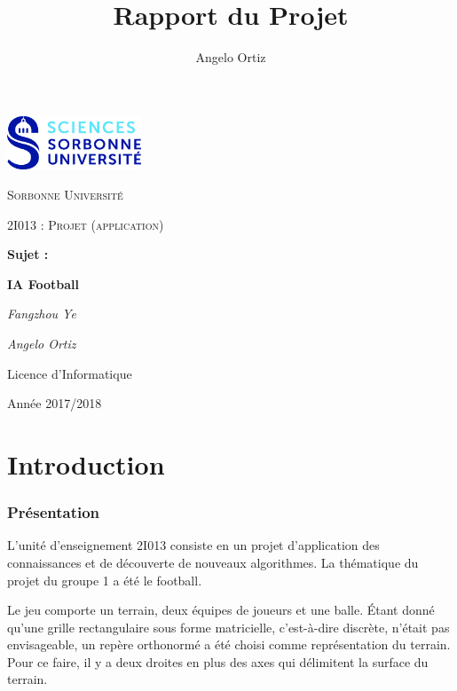 \documentclass[12pt,a4paper]{article}
\author{Angelo Ortiz}
\title{Rapport du Projet}
\begin{document}
\begin{titlepage}
  \centering
  \includegraphics[width=0.30\textwidth]{../img/logo.jpg}\par\vspace{1cm}
  {\scshape\LARGE Sorbonne Universit\'e\par}
  \vspace{1cm}
  {\scshape\Large 2I013 : Projet (application)\par}
  \vspace{1.5cm}
  {\Large \bfseries Sujet :\par}
  {\huge\bfseries IA Football\par}
  \vspace{2cm}
  {\Large\itshape Fangzhou Ye\par}
  {\Large\itshape Angelo Ortiz\par}
  \vfill
  
  {\large Licence d'Informatique\par}
  {\large Ann\'ee 2017/2018\par}
\end{titlepage}
 
\tableofcontents
\listoffigures
\newpage
  
\part*{Introduction}
\section*{Pr\'esentation}
L'unit\'e d'enseignement 2I013 consiste en un projet d'application des 
connaissances et de d\'ecouverte de nouveaux algorithmes. La th\'ematique du 
projet du groupe 1 a \'et\'e le football.

Le jeu comporte un terrain, deux \'equipes de joueurs et une 
balle. \'Etant donn\'e qu'une grille rectangulaire sous forme matricielle, 
c'est-\`a-dire discr\`ete, n'\'etait pas envisageable, un rep\`ere 
orthonorm\'e a \'et\'e choisi comme repr\'esentation du terrain. Pour ce faire, 
il y a deux droites en plus des axes qui d\'elimitent la surface du terrain.
\end{document}
